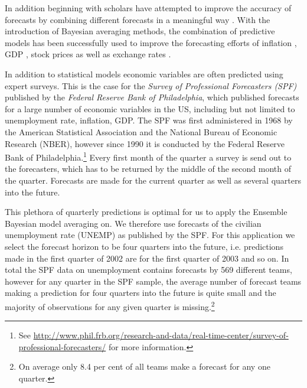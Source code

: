 \documentclass[12pt,fullpage,endnotes]{article}
\begin{document}
In addition beginning with \citet{Bates:1969} scholars have attempted to improve the accuracy of forecasts by combining different forecasts in a meaningful way \citep{Palm:Zellner:1992,Elliott:Timmermann:2008}.  With the introduction of Bayesian averaging methods, the combination of predictive models has been successfully used to improve the forecasting efforts of inflation \citep{Koop:2010,Wright:2009}, GDP \citep{Billio:2010}, stock prices \citep{Billio:2011} as well as exchange rates \citep{Wright:2008}.  

In addition to statistical models economic variables are often predicted using expert surveys. This is the case for the \textit{Survey of Professional Forecasters (SPF)} published by the \textit{Federal Reserve Bank of Philadelphia}, which published forecasts for a large number of economic variables in the US, including but not limited to unemployment rate, inflation, GDP. The SPF was first administered in 1968 by the American Statistical Association and the National Bureau of Economic Research (NBER), however since 1990 it is conducted by the Federal Reserve Bank of Philadelphia.\footnote{See \url{http://www.phil.frb.org/research-and-data/real-time-center/survey-of-professional-forecasters/} for more information.} Every first month of the quarter a survey is send out to the forecasters, which has to be returned by the middle of the second month of the quarter. Forecasts are made for the current quarter as well as several quarters into the future. 

This plethora of quarterly predictions is optimal for us to apply the Ensemble Bayesian model averaging on. We therefore use forecasts of the civilian unemployment rate (UNEMP) as published by the SPF. For this application we select the forecast horizon to be four quarters into the future, i.e. predictions made in the first quarter of 2002 are for the first quarter of 2003 and so on. In total the SPF data on unemployment contains forecasts by 569 different teams, however for any quarter in the SPF sample, the average number of forecast teams making a prediction for four quarters into the future is quite small and the majority of observations for any given quarter is missing.\footnote{On average only 8.4 per cent of all teams make a forecast for any one quarter.}
\end{document}
